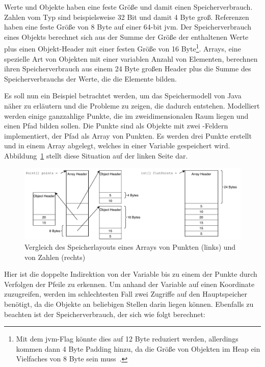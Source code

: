 Werte und Objekte haben eine feste Größe und damit einen Speicherverbrauch.
Zahlen vom Typ  sind beispielsweise 32 Bit und damit 4 Byte groß.
Referenzen haben eine feste Größe von 8 Byte auf einer 64-bit \ac{jvm}.
Der Speicherverbrauch eines Objekts berechnet sich aus der Summe der Größe der enthaltenen Werte plus einen Objekt-Header mit einer festen Größe von 16 Byte\footnote{Mit dem \ac{jvm}-Flag  könnte dies auf 12 Byte reduziert werden, allerdings kommen dann 4 Byte Padding hinzu, da die Größe von Objekten im Heap ein Vielfaches von 8 Byte sein muss~\cite{compressed-oops}.}.
Arrays, eine spezielle Art von Objekten mit einer variablen Anzahl von Elementen, berechnen ihren Speicherverbrauch aus einem 24 Byte großen Header plus die Summe des Speicherverbrauchs der Werte, die die Elemente bilden.
~\cite{compressed-oops}

Es soll nun ein Beispiel betrachtet werden, um das Speichermodell von Java näher zu erläutern und die Probleme zu zeigen, die dadurch entstehen.
Modelliert werden einige ganzzahlige Punkte, die im zweidimensionalen Raum liegen und einen Pfad bilden sollen.
Die Punkte sind als Objekte mit zwei -Feldern implementiert, der Pfad als Array von Punkten.
Es werden drei Punkte erstellt und in einem Array abgelegt, welches in einer Variable gespeichert wird.
Abbildung~\ref{fig:memory-usage} stellt diese Situation auf der linken Seite dar.

\begin{figure}[htp]
    \centering
    \includegraphics[width=\textwidth]{img/memory-usage.pdf}
    \vspace{-3ex}
    \caption{Vergleich des Speicherlayouts eines Arrays von Punkten (links) und von Zahlen (rechts)}
    \label{fig:memory-usage}
\end{figure}

Hier ist die doppelte Indirektion von der Variable bis zu einem der Punkte durch Verfolgen der Pfeile zu erkennen.
Um anhand der Variable auf einen Koordinate zuzugreifen, werden im schlechtesten Fall zwei Zugriffe auf den Hauptspeicher benötigt, da die Objekte an beliebigen Stellen darin liegen können.
Ebenfalls zu beachten ist der Speicherverbrauch, der sich wie folgt berechnet:

